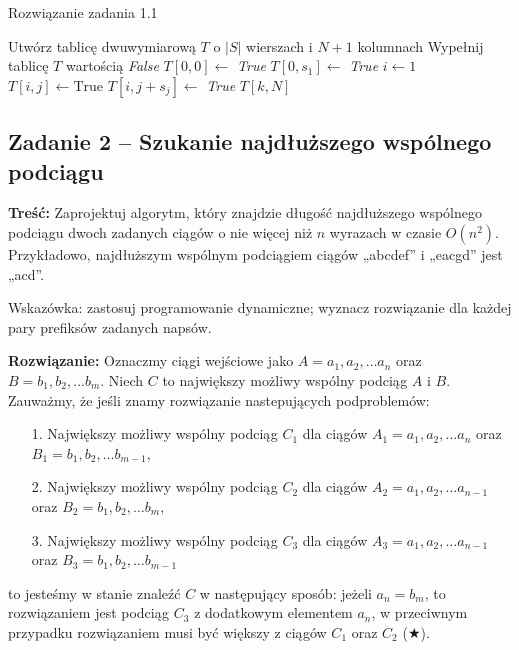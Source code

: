 \begin{algorithm}[H]
	\caption{Rozwiązanie zadania 1.1}\label{Zadanie11}
	\begin{algorithmic}[1]
		\State Utwórz tablicę dwuwymiarową $T$ o $|S|$ wierszach i $N + 1$ kolumnach 
		\State Wypełnij tablicę $T$ wartością \textit{False}
		\State $T[0, 0] \gets $ \textit{True}
		\State $T[0, s_1] \gets $ \textit{True}
		\State $i \gets 1$
		\State $T[i, j] \gets \text{True}$
		\State $T[i, j + s_j] \gets$ \textit{True}
		\EndIf
		\EndIf
		\EndFor 
		\EndFor
		\State \Return $T[k, N]$
		\EndProcedure 
	\end{algorithmic}
\end{algorithm}

\subsection{Zadanie 2 -- Szukanie najdłuższego wspólnego podciągu}
\textbf{Treść:} Zaprojektuj algorytm, który znajdzie długość najdłuższego wspólnego podciągu dwoch zadanych ciągów
o nie więcej niż $n$ wyrazach w czasie $O(n^2)$. Przykładowo, najdłuższym wspólnym podciągiem 
ciągów „abcdef” i „eacgd” jest „acd”.

Wskazówka: zastosuj programowanie dynamiczne; wyznacz rozwiązanie dla każdej pary prefiksów zadanych napsów.

\textbf{Rozwiązanie:}
Oznaczmy ciągi wejściowe jako 
$A = a_1, a_2, \dots a_n$ oraz 
$B = b_1, b_2, \dots b_m$. Niech $C$ to największy możliwy
wspólny podciąg $A$ i $B$.  Zauważmy, że jeśli znamy rozwiązanie
nastepujących podproblemów:
\begin{itemize}
	\item[1.] Największy możliwy wspólny podciąg $C_1$ dla ciągów $A_1=a_1, a_2, \dots a_n$ oraz 
	$B_1=b_1, b_2, \dots b_{m-1}$,
	\item[2.] Największy możliwy wspólny podciąg $C_2$ dla ciągów $A_2 =a_1, a_2, \dots a_{n-1}$ oraz 
	$B_2=b_1, b_2, \dots b_{m}$,
	\item[3.] Największy możliwy wspólny podciąg $C_3$ dla ciągów $A_3=a_1, a_2, \dots a_{n-1}$ oraz 
	$B_3=b_1, b_2, \dots b_{m-1}$
\end{itemize}
to jesteśmy w stanie znaleźć $C$
w następujący sposób: jeżeli $a_n = b_m$, to rozwiązaniem 
jest podciąg $C_3$ z dodatkowym elementem $a_n$, w przeciwnym przypadku
rozwiązaniem musi być większy z ciągów $C_1$ oraz $C_2$ ($\bigstar$). 

